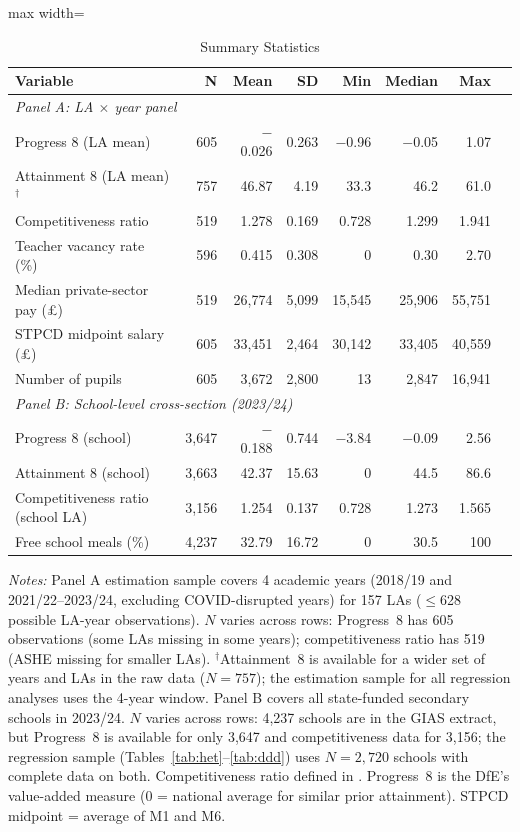 \documentclass[12pt]{article}
\begin{document}
\begin{table}[H]
\centering
\caption{Summary Statistics}
\label{tab:summary}
\begin{threeparttable}
\begin{adjustbox}{max width=\textwidth}
\begin{tabular}{lrrrrrrr}
\toprule
Variable & N & Mean & SD & Min & Median & Max \\
\midrule
\multicolumn{7}{l}{\textit{Panel A: LA $\times$ year panel}} \\
Progress 8 (LA mean) & 605 & $-$0.026 & 0.263 & $-$0.96 & $-$0.05 & 1.07 \\
Attainment 8 (LA mean)$^\dagger$ & 757 & 46.87 & 4.19 & 33.3 & 46.2 & 61.0 \\
Competitiveness ratio & 519 & 1.278 & 0.169 & 0.728 & 1.299 & 1.941 \\
Teacher vacancy rate (\%) & 596 & 0.415 & 0.308 & 0 & 0.30 & 2.70 \\
Median private-sector pay (\pounds) & 519 & 26,774 & 5,099 & 15,545 & 25,906 & 55,751 \\
STPCD midpoint salary (\pounds) & 605 & 33,451 & 2,464 & 30,142 & 33,405 & 40,559 \\
Number of pupils & 605 & 3,672 & 2,800 & 13 & 2,847 & 16,941 \\
[0.5em]
\multicolumn{7}{l}{\textit{Panel B: School-level cross-section (2023/24)}} \\
Progress 8 (school) & 3,647 & $-$0.188 & 0.744 & $-$3.84 & $-$0.09 & 2.56 \\
Attainment 8 (school) & 3,663 & 42.37 & 15.63 & 0 & 44.5 & 86.6 \\
Competitiveness ratio (school LA) & 3,156 & 1.254 & 0.137 & 0.728 & 1.273 & 1.565 \\
Free school meals (\%) & 4,237 & 32.79 & 16.72 & 0 & 30.5 & 100 \\
\bottomrule
\end{tabular}
\end{adjustbox}
\begin{tablenotes}[flushleft]
\small
\item \textit{Notes:} Panel A estimation sample covers 4 academic years (2018/19 and 2021/22--2023/24, excluding COVID-disrupted years) for 157 LAs ($\leq$628 possible LA-year observations). $N$ varies across rows: Progress~8 has 605 observations (some LAs missing in some years); competitiveness ratio has 519 (ASHE missing for smaller LAs). $^\dagger$Attainment~8 is available for a wider set of years and LAs in the raw data ($N=757$); the estimation sample for all regression analyses uses the 4-year window. Panel B covers all state-funded secondary schools in 2023/24. $N$ varies across rows: 4,237 schools are in the GIAS extract, but Progress~8 is available for only 3,647 and competitiveness data for 3,156; the regression sample (Tables~\ref{tab:het}--\ref{tab:ddd}) uses $N = 2{,}720$ schools with complete data on both. Competitiveness ratio defined in . Progress~8 is the DfE's value-added measure (0 = national average for similar prior attainment). STPCD midpoint = average of M1 and M6.
\end{tablenotes}
\end{threeparttable}
\end{table}
\end{document}
